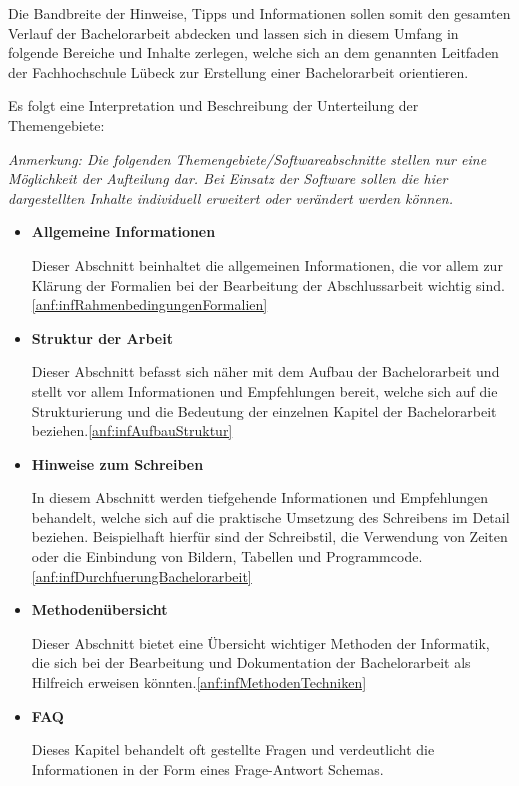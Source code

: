 \documentclass[bibliography=totoc,listof=totoc,BCOR=5mm,DIV=12,oneside]{scrbook}
\begin{document}
\par\medskip Die Bandbreite der Hinweise, Tipps und Informationen sollen somit den gesamten Verlauf der Bachelorarbeit abdecken und lassen sich in diesem Umfang in folgende Bereiche und Inhalte zerlegen, welche sich an dem genannten Leitfaden der Fachhochschule Lübeck zur Erstellung einer Bachelorarbeit orientieren.

\par\medskip Es folgt eine Interpretation und Beschreibung der Unterteilung der Themengebiete:

\par\medskip \textit{Anmerkung: Die folgenden Themengebiete/Softwareabschnitte stellen nur eine Möglichkeit der Aufteilung dar. Bei Einsatz der Software sollen die hier dargestellten Inhalte individuell erweitert oder verändert werden können.}

\begin{itemize}
\item \textbf{Allgemeine Informationen}
\par Dieser Abschnitt beinhaltet die allgemeinen Informationen, die vor allem zur Klärung der Formalien bei der Bearbeitung der Abschlussarbeit wichtig sind.\ref{anf:infRahmenbedingungenFormalien}

\item \textbf{Struktur der Arbeit}
\par Dieser Abschnitt befasst sich näher mit dem Aufbau der Bachelorarbeit und stellt vor allem Informationen und Empfehlungen bereit, welche sich auf die Strukturierung und die Bedeutung der einzelnen Kapitel der Bachelorarbeit beziehen.\ref{anf:infAufbauStruktur}

\item \textbf{Hinweise zum Schreiben}
\par In diesem Abschnitt werden tiefgehende Informationen und Empfehlungen behandelt, welche sich auf die praktische Umsetzung des Schreibens im Detail beziehen. Beispielhaft hierfür sind der Schreibstil, die Verwendung von Zeiten oder die Einbindung von Bildern, Tabellen und Programmcode.\ref{anf:infDurchfuerungBachelorarbeit}

\item \textbf{Methodenübersicht}
\par Dieser Abschnitt bietet eine Übersicht wichtiger Methoden der Informatik, die sich bei der Bearbeitung und Dokumentation der Bachelorarbeit als Hilfreich erweisen könnten.\ref{anf:infMethodenTechniken}

\item \textbf{FAQ}
\par Dieses Kapitel behandelt oft gestellte Fragen und verdeutlicht die Informationen in der Form eines Frage-Antwort Schemas.
\end{itemize}
\end{document}
